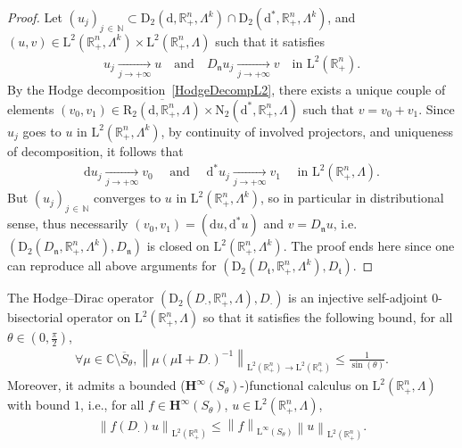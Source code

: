 \documentclass[AHL,Unicode,longabstracts,published]{cedram}
\newcommand{\bbR}{\mathbb{R}}
\newcommand{\bbC}{\mathbb{C}}
\newcommand{\bbN}{\mathbb{N}}
\newcommand{\rmd}{\mathrm{d}}
\newcommand{\rmD}{\mathrm{D}}
\newcommand{\rmL}{\mathrm{L}}
\newcommand{\rmR}{\mathrm{R}}
\newcommand{\rmN}{\mathrm{N}}
\newcommand{\rmI}{\mathrm{I}}
\newcommand{\bfH}{\mathbf{H}}
\newcommand{\fkn}{\mathfrak{n}}
\newcommand{\fkt}{\mathfrak{t}}
\let\oldforall\forall
\renewcommand*{\forall}{\mathrel{\oldforall}}
\begin{document}
\begin{proof}
Let $(u_j)_{j\,\in\,\bbN}\subset \rmD_2({\rmd},\bbR^n_+,\Lambda^k)\cap\rmD_2({\rmd^\ast},\bbR^n_+,\Lambda^k)$, and $(u,v)\in\rmL^2(\bbR^n_+, \Lambda^k)\times\rmL^2(\bbR^n_+, \Lambda)$ such that it satisfies
\begin{align*}
u_j \xrightarrow[j\rightarrow +\infty]{} u \quad\text{and}\quad D_\fkn u_j \xrightarrow[j\rightarrow +\infty]{} v \quad\text{in } \rmL^2\left(\bbR^n_+\right) .
\end{align*}
By the Hodge decomposition~\eqref{HodgeDecompL2}, there exists a unique couple of elements $({v}_{0},{v}_{1})\in \overline{\rmR_2({\rmd},\bbR^n_+,\Lambda)}\times \rmN _2({\rmd^\ast},\bbR^n_+,\Lambda)$ such that $v={v}_{0}+{v}_{1}$. Since $u_j$ goes to $u$ in $\rmL^2(\bbR^n_+,\Lambda^k)$, by continuity of involved projectors, and uniqueness of decomposition, it follows that
\begin{align*}
\rmd u_j \xrightarrow[j\rightarrow +\infty]{} v_0 \quad\text{ and }\quad \rmd^\ast u_j \xrightarrow[j\rightarrow +\infty]{} v_1 \quad\text{ in } \rmL^2\left(\bbR^n_+,\Lambda\right) .
\end{align*}
But $(u_j)_{j\,\in\,\bbN }$ converges to $u$ in $\rmL^2(\bbR^n_+,\Lambda^k)$, so in particular in distributional sense, thus necessarily $(v_0,v_1)=(\rmd u,\rmd^\ast u)$ and $v=D_\fkn u$, i.e.  $(\rmD_2(D_{\fkn},\bbR^n_+,\Lambda^k),D_{\fkn})$ is closed on $\rmL^2(\bbR^n_+,\Lambda^k)$. The proof ends here since one can reproduce all above arguments for $(\rmD_2(D_{\fkt},\bbR^n_+,\Lambda^k),D_{\fkt})$.
\end{proof}


\begin{prop}\label{prop:HodgeDiracL2Rn+}
The Hodge--Dirac operator $(\rmD_2(D_\cdot,\bbR^n_+,\Lambda),D_\cdot)$ is an injective self-adjoint $0$-bisectorial operator on $\rmL^2(\bbR^n_+,\Lambda)$ so that it satisfies the following bound, for all $\theta\in (0,\frac{\pi}{2})$,
\begin{align}\label{eq:resolvEstDiracL2}
\forall \mu\in\bbC\setminus \overline{S}_\theta, \left\| \mu(\mu\rmI + D_\cdot)^{-1}\right\|_{\rmL^2\left(\bbR^n_+\right)\rightarrow \rmL^2\left(\bbR^n_+\right)}\leqslant \frac{1}{\sin(\theta)} .
\end{align}
Moreover, it admits a bounded ($\bfH^\infty(S_\theta)$-)functional calculus on $\rmL^2(\bbR^n_+,\Lambda)$ with bound $1$, i.e., for all $f\in\bfH^\infty(S_\theta)$, $u\in\rmL^2(\bbR^n_+,\Lambda)$,
\begin{align}
\left\| f(D_\cdot)u\right\|_{\rmL^2\left(\bbR^n_+\right)}\leqslant \left\| f\right\|_{\rmL^\infty(S_\theta)}\left\| u\right\|_{\rmL^2\left(\bbR^n_+\right)}.
\end{align}
\end{prop}
\end{document}

